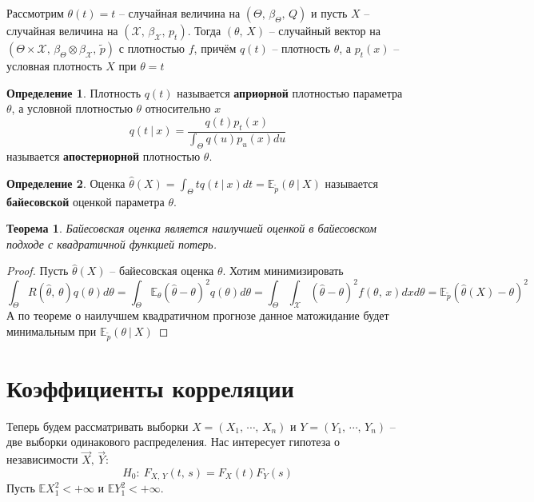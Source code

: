\documentclass[a4paper,12pt]{article}
\theoremstyle{plain}
\newtheorem{theorem}{Теорема}[section]
\theoremstyle{definition}
\newtheorem{definition}{Определение}[section]
\theoremstyle{remark}
\begin{document}
Рассмотрим $\theta(t) = t$ -- случайная величина на $(\Theta,\, \beta_\Theta,\, Q)$ и пусть $X$ -- случайная величина на $(\mathcal{X},\, \beta_\mathcal{X},\, p_t)$. Тогда $(\theta,\, X)$ -- случайный вектор на $(\Theta \times\mathcal{X},\, \beta_\Theta\otimes\beta_\mathcal{X},\, \tilde{p})$ с плотностью $f$, причём $q(t)$ -- плотность $\theta$, а $p_t(x)$ -- условная плотность $X$ при $\theta = t$

\begin{definition}
  Плотность $q(t)$ называется \textbf{априорной} плотностью параметра $\theta$, а условной плотностью $\theta$ относительно $x$ 
  \[
    q(t \:\vert\: x) = \frac{q(t)p_t(x)}{\int_\Theta q(u)p_u(x)du}
  \]
  называется \textbf{апостериорной} плотностью $\theta$.
\end{definition}

\begin{definition}
  Оценка $\hat{\theta}(X) = \int_\Theta tq(t \:\vert\: x)dt = \mathbb{E}_{\tilde{p}}(\theta \:\vert\: X)$ называется \textbf{байесовской} оценкой параметра $\theta$.
\end{definition}

\begin{theorem}
  Байесовская оценка является наилучшей оценкой в байесовском подходе с квадратичной функцией потерь.
\end{theorem}

\begin{proof}
  Пусть $\hat{\theta}(X)$ -- байесовская оценка $\theta$. Хотим минимизировать
  \[
    \int_\Theta R(\hat{\theta},\, \theta)q(\theta)d\theta = \int_\Theta\mathbb{E}_\theta(\hat{\theta} - \theta)^2q(\theta)d\theta = \int_\Theta\int_\mathcal{X}(\hat{\theta} - \theta)^2f(\theta,\,x)dxd\theta = \mathbb{E}_{\tilde{p}}(\hat{\theta}(X) - \theta)^2 
  \]
  А по теореме о наилучшем квадратичном прогнозе данное матожидание будет минимальным при $\mathbb{E}_{\tilde{p}}(\theta\:\vert\:X)$
\end{proof}

\section{Коэффициенты корреляции}
Теперь будем рассматривать выборки $X = (X_1,\,\cdots,\,X_n)$ и $Y = (Y_1,\,\cdots,\,Y_n)$ -- две выборки одинакового распределения. Нас интересует гипотеза о независимости $\vec{X},\, \vec{Y}$:
\[
  H_0 :\: F_{X,\, Y}(t,\,s) = F_X(t)F_Y(s)
\]
Пусть $\mathbb{E}X_1^2 < +\infty$ и $\mathbb{E}Y_1^2 < +\infty$.
\end{document}
